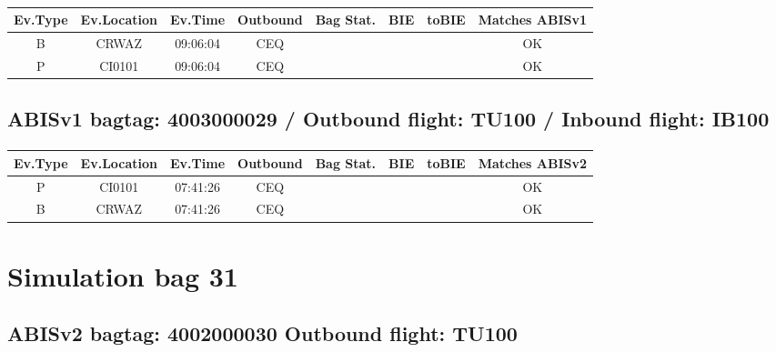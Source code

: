 \documentclass{report}
\begin{document}
\paragraph{}
\begin{longtable}{cccccccc}    \toprule
\rowcolor{white!50}
\textbf{Ev.Type} & \textbf{Ev.Location} & \textbf{Ev.Time} & \textbf{Outbound} & \textbf{Bag Stat.} & \textbf{BIE} & \textbf{toBIE} & \textbf{Matches ABISv1} \\\midrule
B & CRWAZ & 09:06:04  & CEQ &  &  &  & OK\\
P & CI0101 & 09:06:04  & CEQ &  &  &  & OK\\
\bottomrule
\end{longtable}
\subsection*{ABISv1 bagtag: 4003000029 / Outbound flight: TU100 / Inbound flight: IB100}
\paragraph{}
\begin{longtable}{cccccccc}    \toprule
\rowcolor{white!50}
\textbf{Ev.Type} & \textbf{Ev.Location} & \textbf{Ev.Time} & \textbf{Outbound} & \textbf{Bag Stat.} & \textbf{BIE} & \textbf{toBIE} & \textbf{Matches ABISv2} \\\midrule
P & CI0101 & 07:41:26  & CEQ &  &  &  & OK\\
B & CRWAZ & 07:41:26  & CEQ &  &  &  & OK\\
\bottomrule
\end{longtable}
\pagebreak
\section*{Simulation bag 31}
\subsection*{ABISv2 bagtag: 4002000030 Outbound flight: TU100}
\end{document}
